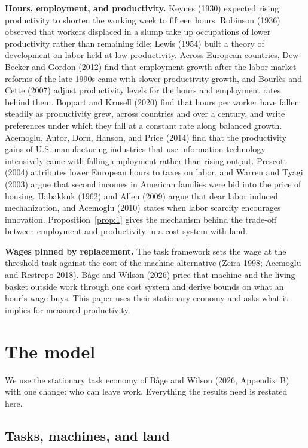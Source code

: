 \documentclass[12pt]{article}
\theoremstyle{plain}
\begin{document}
\textbf{Hours, employment, and productivity.} Keynes (1930) expected rising productivity to shorten the working week to fifteen hours. Robinson (1936) observed that workers displaced in a slump take up occupations of lower productivity rather than remaining idle; Lewis (1954) built a theory of development on labor held at low productivity. Across European countries, Dew-Becker and Gordon (2012) find that employment growth after the labor-market reforms of the late 1990s came with slower productivity growth, and Bourl\`es and Cette (2007) adjust productivity levels for the hours and employment rates behind them. Boppart and Krusell (2020) find that hours per worker have fallen steadily as productivity grew, across countries and over a century, and write preferences under which they fall at a constant rate along balanced growth. Acemoglu, Autor, Dorn, Hanson, and Price (2014) find that the productivity gains of U.S. manufacturing industries that use information technology intensively came with falling employment rather than rising output. Prescott (2004) attributes lower European hours to taxes on labor, and Warren and Tyagi (2003) argue that second incomes in American families were bid into the price of housing. Habakkuk (1962) and Allen (2009) argue that dear labor induced mechanization, and Acemoglu (2010) states when labor scarcity encourages innovation. Proposition~\ref{prop:1} gives the mechanism behind the trade-off between employment and productivity in a cost system with land.

\textbf{Wages pinned by replacement.} The task framework sets the wage at the threshold task against the cost of the machine alternative (Zeira 1998; Acemoglu and Restrepo 2018). B\r{a}ge and Wilson (2026) price that machine and the living basket outside work through one cost system and derive bounds on what an hour's wage buys. This paper uses their stationary economy and asks what it implies for measured productivity.

\section{The model}\label{sec:3}

We use the stationary task economy of B\r{a}ge and Wilson (2026, Appendix~B) with one change: who can leave work. Everything the results need is restated here.

\subsection{Tasks, machines, and land}\label{sec:3.1}
\end{document}
